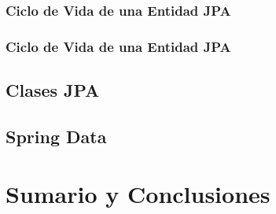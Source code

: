 \documentclass[a4paper,slidestop,xcolor=pst,blue]{beamer}
\begin{document}
\begin{frame}[c]
    \frametitle{Ciclo de Vida de una Entidad JPA}
\end{frame}

\begin{frame}[c]
    \frametitle{Ciclo de Vida de una Entidad JPA}
\end{frame}


\subsection{Clases JPA}

\subsection{Spring Data}

\section{Sumario y Conclusiones}
\end{document}
